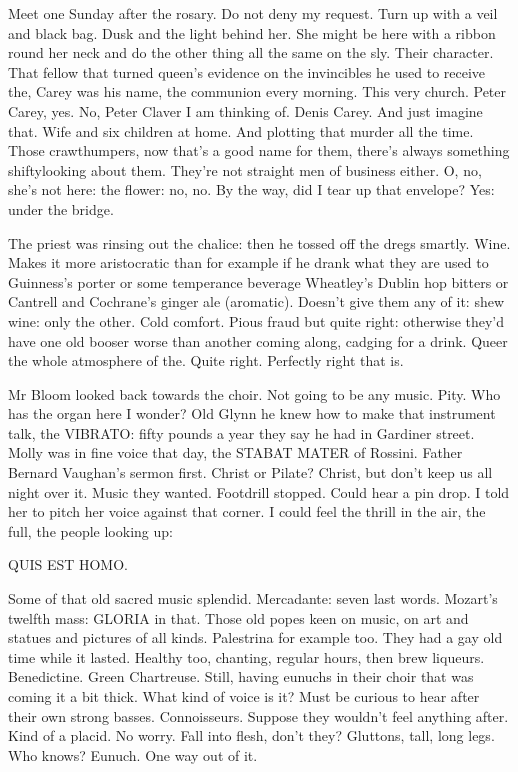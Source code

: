 Meet one Sunday after the rosary. Do not deny my request. Turn up
with a veil and black bag. Dusk and the light behind her. She might be
here with a ribbon round her neck and do the other thing all the same on
the sly. Their character. That fellow that turned queen's evidence on the
invincibles he used to receive the, Carey was his name, the communion
every morning. This very church. Peter Carey, yes. No, Peter Claver I am
thinking of. Denis Carey. And just imagine that. Wife and six children
at home. And plotting that murder all the time. Those crawthumpers,
now that's a good name for them, there's always something shiftylooking
about them. They're not straight men of business either. O, no, she's
not here: the flower: no, no. By the way, did I tear up that envelope?
Yes: under the bridge.

The priest was rinsing out the chalice: then he tossed off the dregs
smartly. Wine. Makes it more aristocratic than for example if he drank
what they are used to Guinness's porter or some temperance beverage
Wheatley's Dublin hop bitters or Cantrell and Cochrane's ginger ale
(aromatic). Doesn't give them any of it: shew wine: only the other. Cold
comfort. Pious fraud but quite right: otherwise they'd have one old booser
worse than another coming along, cadging for a drink. Queer the whole
atmosphere of the. Quite right. Perfectly right that is.

Mr Bloom looked back towards the choir. Not going to be any music.
Pity. Who has the organ here I wonder? Old Glynn he knew how to make
that instrument talk, the VIBRATO: fifty pounds a year they say he had in
Gardiner street. Molly was in fine voice that day, the STABAT MATER of
Rossini. Father Bernard Vaughan's sermon first. Christ or Pilate? Christ,
but don't keep us all night over it. Music they wanted. Footdrill stopped.
Could hear a pin drop. I told her to pitch her voice against that corner.
I could feel the thrill in the air, the full, the people looking up:

QUIS EST HOMO.

Some of that old sacred music splendid. Mercadante: seven last
words. Mozart's twelfth mass: GLORIA in that. Those old popes keen on
music, on art and statues and pictures of all kinds. Palestrina for
example too. They had a gay old time while it lasted. Healthy too,
chanting, regular hours, then brew liqueurs. Benedictine. Green
Chartreuse. Still, having eunuchs in their choir that was coming it a bit
thick. What kind of voice is it? Must be curious to hear after their own
strong basses. Connoisseurs. Suppose they wouldn't feel anything after.
Kind of a placid. No worry. Fall into flesh, don't they? Gluttons, tall,
long legs. Who knows? Eunuch. One way out of it.

